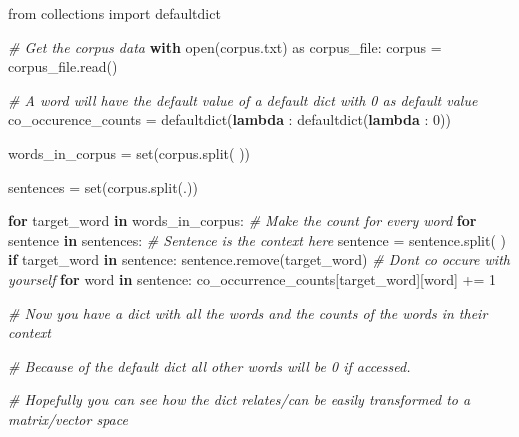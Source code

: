 \documentclass[
  11pt,
  british,
]{article}
\newenvironment{Shaded}{}{}
\newcommand{\BuiltInTok}[1]{#1}
\newcommand{\CommentTok}[1]{\textcolor[rgb]{0.38,0.63,0.69}{\textit{#1}}}
\newcommand{\ControlFlowTok}[1]{\textcolor[rgb]{0.00,0.44,0.13}{\textbf{#1}}}
\newcommand{\DecValTok}[1]{\textcolor[rgb]{0.25,0.63,0.44}{#1}}
\newcommand{\ImportTok}[1]{#1}
\newcommand{\KeywordTok}[1]{\textcolor[rgb]{0.00,0.44,0.13}{\textbf{#1}}}
\newcommand{\NormalTok}[1]{#1}
\newcommand{\OperatorTok}[1]{\textcolor[rgb]{0.40,0.40,0.40}{#1}}
\newcommand{\StringTok}[1]{\textcolor[rgb]{0.25,0.44,0.63}{#1}}
\begin{document}
\begin{Shaded}
\begin{Highlighting}[]
\ImportTok{from}\NormalTok{ collections }\ImportTok{import}\NormalTok{ defaultdict}

\CommentTok{\# Get the corpus data}
\ControlFlowTok{with} \BuiltInTok{open}\NormalTok{(}\StringTok{\textquotesingle{}corpus.txt\textquotesingle{}}\NormalTok{) }\ImportTok{as}\NormalTok{ corpus\_file:}
\NormalTok{    corpus }\OperatorTok{=}\NormalTok{ corpus\_file.read()}

\CommentTok{\# A word will have the default value of a default dict with 0 as default value}
\NormalTok{co\_occurence\_counts }\OperatorTok{=}\NormalTok{ defaultdict(}\KeywordTok{lambda}\NormalTok{ : defaultdict(}\KeywordTok{lambda}\NormalTok{ : }\DecValTok{0}\NormalTok{))}

\NormalTok{words\_in\_corpus }\OperatorTok{=} \BuiltInTok{set}\NormalTok{(corpus.split(}\StringTok{\textquotesingle{} \textquotesingle{}}\NormalTok{))}

\NormalTok{sentences }\OperatorTok{=} \BuiltInTok{set}\NormalTok{(corpus.split(}\StringTok{\textquotesingle{}.\textquotesingle{}}\NormalTok{))}

\ControlFlowTok{for}\NormalTok{ target\_word }\KeywordTok{in}\NormalTok{ words\_in\_corpus: }\CommentTok{\# Make the count for every word }
    \ControlFlowTok{for}\NormalTok{ sentence }\KeywordTok{in}\NormalTok{ sentences:  }\CommentTok{\# Sentence is the context here}
\NormalTok{        sentence }\OperatorTok{=}\NormalTok{ sentence.split(}\StringTok{\textquotesingle{} \textquotesingle{}}\NormalTok{)}
        \ControlFlowTok{if}\NormalTok{ target\_word }\KeywordTok{in}\NormalTok{ sentence:}
\NormalTok{            sentence.remove(target\_word) }\CommentTok{\# Don\textquotesingle{}t co occure with yourself}
            \ControlFlowTok{for}\NormalTok{ word }\KeywordTok{in}\NormalTok{ sentence:}
\NormalTok{                co\_occurrence\_counts[target\_word][word] }\OperatorTok{+=} \DecValTok{1}

\CommentTok{\# Now you have a dict with all the words and the counts of the words in their context}

\CommentTok{\# Because of the default dict all other words will be 0 if accessed.}

\CommentTok{\# Hopefully you can see how the dict relates/can be easily transformed to a matrix/vector space }
\end{Highlighting}
\end{Shaded}
\end{document}
